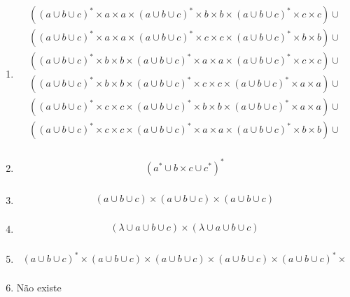 \begin{question}
\begin{enumerate}[label=\alph*)]
   		\item 
   		\begin{align*}
   			((a \cup b \cup c)^{*} \times a \times a \times (a \cup b \cup c)^{*} \times b \times b \times (a \cup b \cup c)^{*} \times c \times c) \cup  \\
   			((a \cup b \cup c)^{*} \times a \times a \times (a \cup b \cup c)^{*} \times c \times c \times (a \cup b \cup c)^{*} \times b \times b) \cup  \\
   			((a \cup b \cup c)^{*} \times b \times b \times (a \cup b \cup c)^{*} \times a \times a \times (a \cup b \cup c)^{*} \times c \times c) \cup  \\
   			((a \cup b \cup c)^{*} \times b \times b \times (a \cup b \cup c)^{*} \times c \times c \times (a \cup b \cup c)^{*} \times a \times a) \cup  \\
   			((a \cup b \cup c)^{*} \times c \times c \times (a \cup b \cup c)^{*} \times b \times b \times (a \cup b \cup c)^{*} \times a \times a) \cup  \\
   			((a \cup b \cup c)^{*} \times c \times c \times (a \cup b \cup c)^{*} \times a \times a \times (a \cup b \cup c)^{*} \times b \times b) \cup  \\
   		\end{align*}   		
   		\item 
   		\begin{align*}
   			(a^{*} \cup b \times c \cup c^{*})^{*} \\
   		\end{align*}   		
   		
   		\item 
   		\begin{align*}
   			(a \cup b \cup c) \times (a \cup b \cup c) \times (a \cup b \cup c) \\
   		\end{align*}   		
   		
   		\item 
   		\begin{align*}
   			(\lambda \cup a \cup b \cup c) \times (\lambda \cup a \cup b \cup c)  \\
   		\end{align*}   		
   		
   		\item 
   		\begin{align*}
   			(a \cup b \cup c)^{*} \times (a \cup b \cup c) \times (a \cup b \cup c) \times (a \cup b \cup c) \times (a \cup b \cup c)^{*} \times  \\
   		\end{align*}	
   		
   		\item 
   		
   		Não existe
   \end{enumerate}
\end{question}